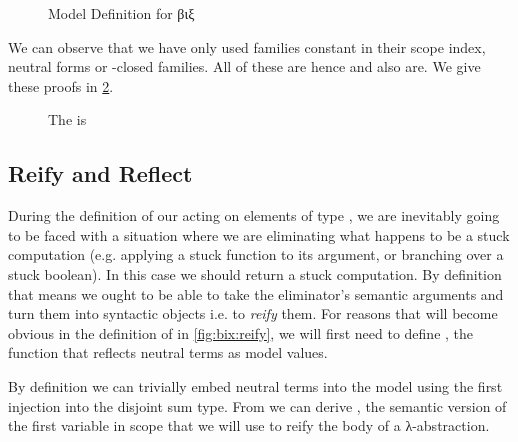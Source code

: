 
\begin{figure}[h]
\caption{Model Definition for βιξ\label{nbestuckmodel}}
\end{figure}

We can observe that we have only used families constant in their scope
index, neutral forms or -closed families. All of these are
 hence  and  also are. We give these
proofs in \cref{fig:thbixmodel}.

\begin{figure}[h]
\caption{The  is }\label{fig:thbixmodel}
\end{figure}

\subsection{Reify and Reflect}

During the definition of our  acting on elements of
type , we are inevitably going to be faced with a situation
where we are eliminating what happens to be a stuck computation
(e.g. applying a stuck function to its argument, or branching over
a stuck boolean).
%
In this case we should return a stuck computation. By definition
that means we ought to be able to take the eliminator's semantic
arguments and turn them into syntactic objects i.e. to \emph{reify}
them. For reasons that will become obvious in the definition of
 in \cref{fig:bix:reify}, we will first need to
define , the function that reflects neutral terms as
model values.

By definition we can trivially embed neutral terms into the model
using the first injection into the disjoint sum type. From 
we can derive , the semantic version of the first variable
in scope that we will use to reify the body of a λ-abstraction.

